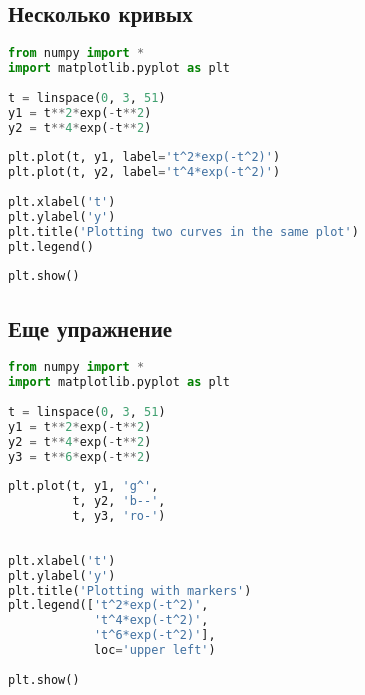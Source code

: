 \documentclass[a4paper,12pt]{article}
\begin{document}
\subsection{Несколько кривых}
\begin{lstlisting}[language=python]
from numpy import *
import matplotlib.pyplot as plt
 
t = linspace(0, 3, 51)
y1 = t**2*exp(-t**2)
y2 = t**4*exp(-t**2)
 
plt.plot(t, y1, label='t^2*exp(-t^2)')
plt.plot(t, y2, label='t^4*exp(-t^2)')
 
plt.xlabel('t')
plt.ylabel('y')
plt.title('Plotting two curves in the same plot')
plt.legend()
 
plt.show()
\end{lstlisting}

\subsection{Еще упражнение}
\begin{lstlisting}[language=python]
from numpy import *
import matplotlib.pyplot as plt
 
t = linspace(0, 3, 51)
y1 = t**2*exp(-t**2)
y2 = t**4*exp(-t**2)
y3 = t**6*exp(-t**2)
 
plt.plot(t, y1, 'g^',    
         t, y2, 'b--',  
         t, y3, 'ro-')  
                         
 
plt.xlabel('t')
plt.ylabel('y')
plt.title('Plotting with markers')
plt.legend(['t^2*exp(-t^2)',
            't^4*exp(-t^2)',
            't^6*exp(-t^2)'],    
            loc='upper left')    
 
plt.show()
\end{lstlisting}
\end{document}
